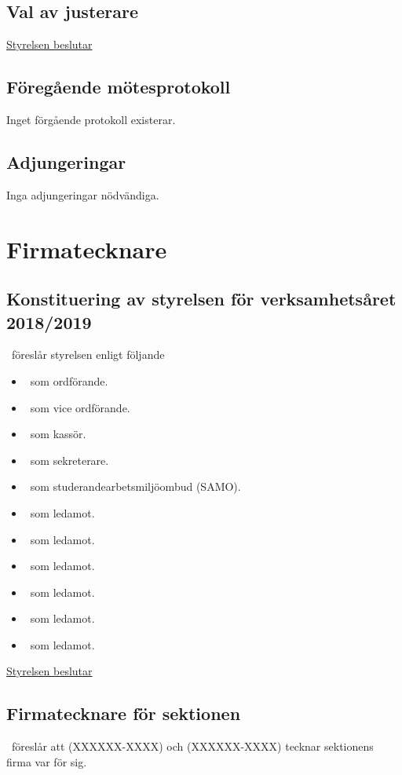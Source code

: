 \documentclass{dTeX-minutes}
\begin{document}
  \subsection{Val av justerare}
    \underline{Styrelsen beslutar}\\
  \subsection{Föregående mötesprotokoll}
     Inget förgående protokoll existerar.
  \subsection{Adjungeringar}
     Inga adjungeringar nödvändiga.

  \section{Firmatecknare}
  \subsection{Konstituering av styrelsen för verksamhetsåret 2018/2019}
    \ordf\ föreslår styrelsen enligt följande
    \begin{itemize}
      \item \ordf~som ordförande.
      \item \vice~som vice ordförande.
      \item \kass~som kassör.
      \item \sekr~som sekreterare.
      \item \samo~som studerandearbetsmiljöombud (SAMO).
      \item \nollkordf~som ledamot.
      \item \deltaordf~som ledamot.
      \item \sexordf~som ledamot.
      \item \rustordf~som ledamot.
      \item \dagordf~som ledamot.
      \item \dnsordf~som ledamot.
    \end{itemize}

    \underline{Styrelsen beslutar}\\

  \subsection{Firmatecknare för sektionen}
    \ordf\ föreslår att \ordf(XXXXXX-XXXX) och \kass(XXXXXX-XXXX) tecknar sektionens firma var för sig.
\end{document}
